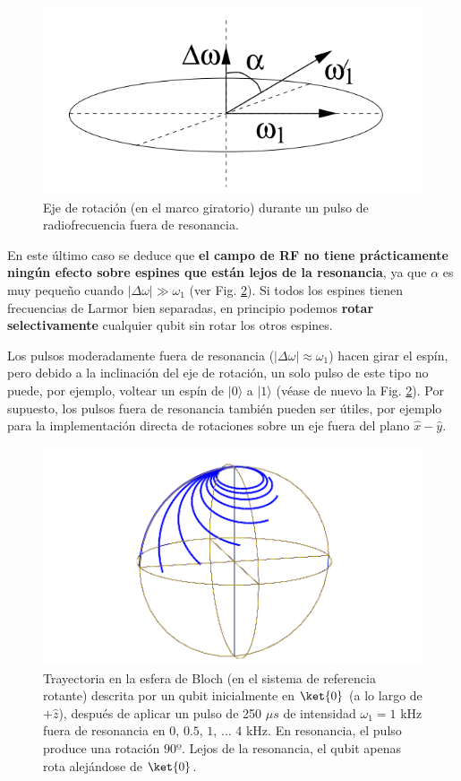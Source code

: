 \begin{itemize}
\begin{itemize}
	\begin{figure}[H]
	\centering 
	\includegraphics[width=0.35\linewidth]{Figuras/Fig_Harware_NMR_nutacion_inclinada.png}
	\caption{Eje de rotación (en el marco giratorio) durante un pulso de radiofrecuencia fuera de resonancia.}
	\label{Fig_Harware_NMR_nutacion_inclinada}
	\end{figure}
	
	\end{itemize}		

\end{itemize}

En este último caso se deduce que \textbf{el campo de RF no tiene prácticamente ningún efecto sobre espines que están lejos de la resonancia}, ya que $\alpha$ es muy pequeño cuando $|\Delta \omega | \gg \omega_1$ (ver Fig. \ref{Fig_Harware_NMR_espiral_bloch_2}). Si todos los espines tienen frecuencias de Larmor bien separadas, en principio podemos \textbf{rotar selectivamente} cualquier qubit sin rotar los otros espines.



Los pulsos moderadamente fuera de resonancia ($|\Delta \omega| \approx \omega_1$) hacen girar el espín, pero debido a la inclinación del eje de rotación, un solo pulso de este tipo no puede, por ejemplo, voltear un espín de $|0 \rangle$ a $|1 \rangle$ (véase de nuevo la Fig. \ref{Fig_Harware_NMR_espiral_bloch_2}). Por supuesto, los pulsos fuera de resonancia también pueden ser útiles, por ejemplo para la implementación directa de rotaciones sobre un eje fuera del plano $\hat{x} - \hat{y}$.

	\begin{figure}[H]
	\centering 
	\includegraphics[width=0.4\linewidth]{Figuras/Fig_Harware_NMR_espiral_bloch_2.png}
	\caption{Trayectoria en la esfera de Bloch (en el sistema de referencia rotante) descrita por un qubit inicialmente en $\ket{0}$ (a lo largo de $+\hat{z}$), después de aplicar un pulso de 250 $\mu s$ de intensidad $\omega_1 = 1$ kHz fuera de resonancia en $0$, $0.5$, $1$, $\dots$ 4 kHz. En resonancia, el pulso produce una rotación $90º$. Lejos de la resonancia, el qubit apenas rota alejándose de $\ket{0}$.}
	\label{Fig_Harware_NMR_espiral_bloch_2}
	\end{figure}

